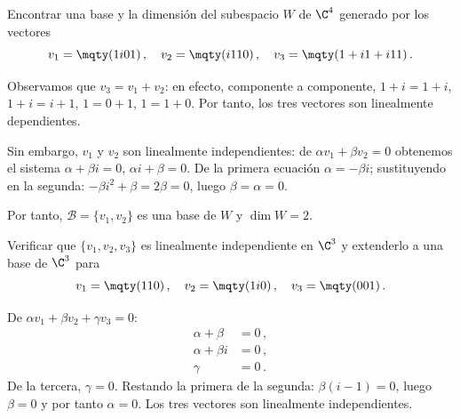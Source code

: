 \begin{questions}
\begin{solution}
  \end{solution}

  \question
  Encontrar una base y la dimensión del subespacio $W$ de $\C^4$ generado por los vectores
  \[
    v_1=\mqty(1\\i\\0\\1)\,,\quad v_2=\mqty(i\\1\\1\\0)\,,\quad v_3=\mqty(1+i\\1+i\\1\\1)\,.
  \]
  \begin{solution}
    Observamos que $v_3 = v_1+v_2$: en efecto, componente a componente, $1+i = 1+i$, $1+i=i+1$, $1=0+1$, $1=1+0$. Por tanto, los tres vectores son linealmente dependientes.

    Sin embargo, $v_1$ y $v_2$ son linealmente independientes: de $\alpha v_1+\beta v_2=0$ obtenemos el sistema $\alpha+\beta i=0$, $\alpha i+\beta=0$. De la primera ecuación $\alpha=-\beta i$; sustituyendo en la segunda: $-\beta i^2+\beta=2\beta=0$, luego $\beta=\alpha=0$.

    Por tanto, $\mathcal{B}=\{v_1,v_2\}$ es una base de $W$ y $\dim W = 2$.
  \end{solution}

  \question
  Verificar que $\{v_1,v_2,v_3\}$ es linealmente independiente en $\C^3$ y extenderlo a una base de $\C^3$ para
  \[
    v_1=\mqty(1\\1\\0)\,,\quad v_2=\mqty(1\\i\\0)\,,\quad v_3=\mqty(0\\0\\1)\,.
  \]
  \begin{solution}
    De $\alpha v_1+\beta v_2+\gamma v_3=0$:
    \begin{align*}
      \alpha+\beta   & = 0\,, \\
      \alpha+\beta i & = 0\,, \\
      \gamma         & = 0\,.
    \end{align*}
    De la tercera, $\gamma=0$. Restando la primera de la segunda: $\beta(i-1)=0$, luego $\beta=0$ y por tanto $\alpha=0$. Los tres vectores son linealmente independientes.


\end{solution}
\end{questions}
